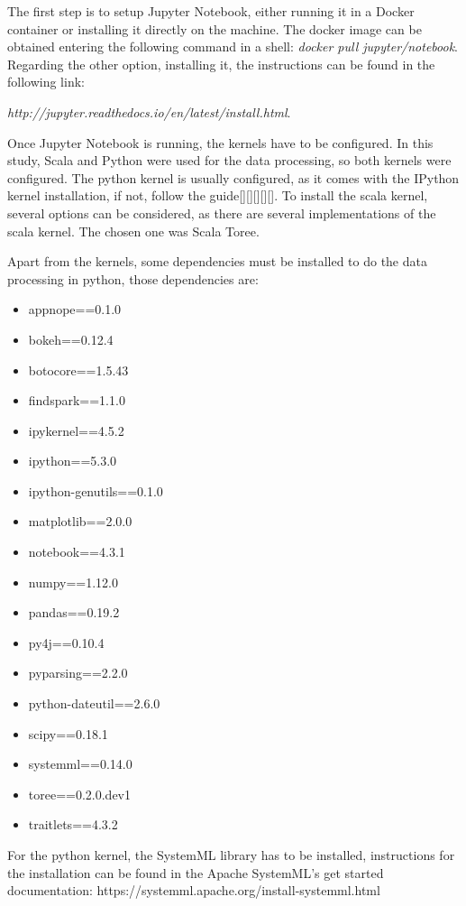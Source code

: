 \documentclass[11pt]{article} %
\begin{document}
    The first step is to setup Jupyter Notebook, either running it in a Docker container or installing it directly on the machine. The docker image can be obtained entering the following command in a shell: \emph{docker pull jupyter/notebook}. Regarding the other option, installing it, the instructions can be found in the following link:

    \emph{http://jupyter.readthedocs.io/en/latest/install.html}.

    Once Jupyter Notebook is running, the kernels have to be configured. In this study, Scala and Python were used for the data processing, so both kernels were configured. The python kernel is usually configured, as it comes with the IPython kernel installation, if not, follow the guide[][][][][]. To install the scala kernel, several options can be considered, as there are several implementations of the scala kernel. The chosen one was Scala Toree.

    Apart from the kernels, some dependencies must be installed to do the data processing in python, those dependencies are:

    \begin{itemize}
      \item appnope==0.1.0
      \item bokeh==0.12.4
      \item botocore==1.5.43
      \item findspark==1.1.0
      \item ipykernel==4.5.2
      \item ipython==5.3.0
      \item ipython-genutils==0.1.0
      \item matplotlib==2.0.0
      \item notebook==4.3.1
      \item numpy==1.12.0
      \item pandas==0.19.2
      \item py4j==0.10.4
      \item pyparsing==2.2.0
      \item python-dateutil==2.6.0
      \item scipy==0.18.1
      \item systemml==0.14.0
      \item toree==0.2.0.dev1
      \item traitlets==4.3.2
    \end{itemize}

    For the python kernel, the SystemML library has to be installed, instructions for the installation can be found in the Apache SystemML's get started documentation: https://systemml.apache.org/install-systemml.html
\end{document}
